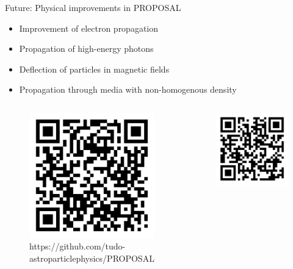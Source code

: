 \documentclass[aspectratio=1610, captions=tableheading, 11pt]{beamer}
\begin{document}
\begin{frame}{Future: Physical improvements in PROPOSAL}
      \begin{itemize}
        \setlength\itemsep{0.5em}
        \item Improvement of electron propagation
        \item Propagation of high-energy photons
        \item Deflection of particles in magnetic fields
        \item Propagation through media with non-homogenous density
      \end{itemize}
\end{frame}


\begin{frame}[t]
  \vspace{-5mm}
  \begin{minipage}[t][0.8\textheight][t]{\textwidth}
      \begin{columns}
      \begin{figure}
          \centering
          \includegraphics[width=0.6\linewidth]{plots/github.pdf}
           \captionsetup{format=myformat}
          \caption*{https://github.com/tudo-\\astroparticlephysics/PROPOSAL}
      \end{figure}
      \begin{figure}
          \centering
          \includegraphics[width=0.6\linewidth]{plots/arxiv.pdf}

\end{figure}
\end{columns}
\end{minipage}
\end{frame}
\end{document}
